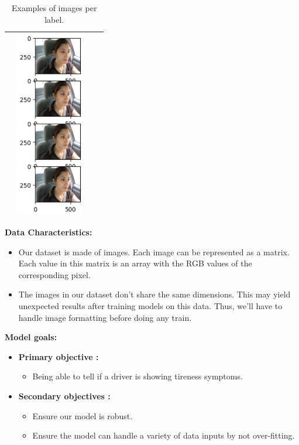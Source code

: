 \documentclass{modeleRapport}
\begin{document}
\begin{table}[H]
\begin{tabular}{|c|c|c|c|}
        &
        \includegraphics[width=3cm]{Images/noYawn.png}
        \\
        \hline
    \end{tabular}
    \caption{Examples of images per label.}
\end{table}

\newpage
\textbf{Data Characteristics:}
\begin{itemize}
    \item Our dataset is made of images. Each image can be represented as a matrix. Each value in this matrix is an array with the RGB values of the corresponding pixel.
    \item The images in our dataset don't share the same dimensions. This may yield unexpected results after training models on this data. Thus, we'll have to handle image formatting before doing any train.\\
\end{itemize}

\textbf{Model goals:}
\begin{itemize}
    \item \textbf{Primary objective :} 
    \begin{itemize}
        \item Being able to tell if a driver is showing tireness symptoms.
    \end{itemize}
    \item \textbf{Secondary objectives :}
    \begin{itemize}
        \item Ensure our model is robust.
        \item Ensure the model can handle a variety of data inputs by not over-fitting.
    \end{itemize}
\end{itemize}
\end{document}
